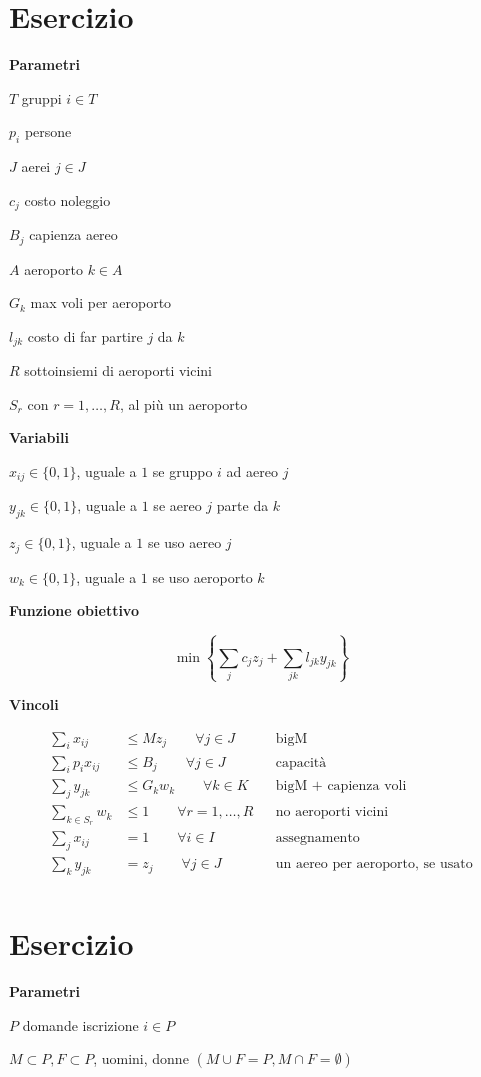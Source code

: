 \documentclass[10pt,a4paper,twoside,openright]{book}
\newcounter{es}
\newcommand{\Es}{
	\stepcounter{es}
	\section{Esercizio \arabic{es}}
	}
\newcommand{\Par}{\textbf{Parametri}}
\newcommand{\Var}{\textbf{Variabili}}
\newcommand{\Fob}{\textbf{Funzione obiettivo}}
\newcommand{\Vin}{\textbf{Vincoli}}
\begin{document}
\Es

\Par

$T$ gruppi $i\in T$

$p_{i}$ persone

$J$ aerei $j\in J$

$c_{j}$ costo noleggio

$B_{j}$ capienza aereo

$A$ aeroporto $k\in A$

$G_{k}$ max voli per aeroporto

$l_{jk}$ costo di far partire $j$ da $k$

$R$ sottoinsiemi di aeroporti vicini

$S_{r}$ con $r=1,\dotsc ,R$, al più un aeroporto

\Var

$x_{ij} \in \{0,1\}$, uguale a $1$ se gruppo $i$ ad aereo $j$

$y_{jk} \in \{0,1\}$, uguale a $1$ se aereo $j$ parte da $k$

$z_{j} \in \{0,1\}$, uguale a $1$ se uso aereo $j$

$w_{k} \in \{0,1\}$, uguale a $1$ se uso aeroporto $k$

\Fob

\begin{equation*}
	\min\left\{\sum _{j} c_{j} z_{j} +\sum _{jk} l_{jk} y_{jk}\right\}
\end{equation*}

\Vin

\begin{align*}
	\sum _{i} x_{ij} &\leq Mz_{j} \qquad\forall j\in J && \text{bigM} \\
	\sum _{i} p_{i} x_{ij} &\leq B_{j} \qquad\forall j\in J && \text{capacità} \\
	\sum _{j} y_{jk} &\leq G_{k} w_{k} \qquad\forall k\in K && \text{bigM + capienza voli} \\
	\sum _{k\in S_{r}} w_{k} &\leq 1\qquad\forall r=1,\dotsc ,R && \text{no aeroporti vicini} \\
	\sum _{j} x_{ij} &=1\qquad\forall i\in I && \text{assegnamento} \\
	\sum _{k} y_{jk} &=z_{j} \qquad\forall j\in J && \text{un aereo per aeroporto, se usato} \\
\end{align*}

\Es

\Par

$P$ domande iscrizione $i\in P$

$M\subset P,F\subset P$, uomini, donne $( M\cup F=P,M\cap F=\emptyset )$
\end{document}
